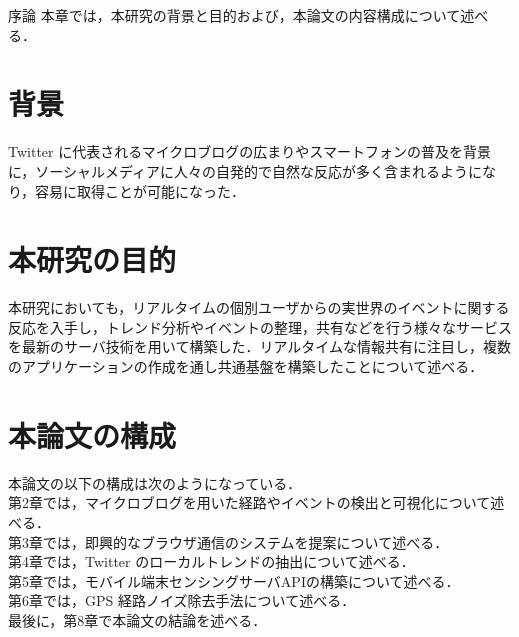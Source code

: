 \chapterhead
{序論}
{本章では，本研究の背景と目的および，本論文の内容構成について述べる．}

\section{背景}
Twitter に代表されるマイクロブログの広まりやスマートフォンの普及を背景に，ソーシャルメディアに人々の自発的で自然な反応が多く含まれるようになり，容易に取得ことが可能になった．

\section{本研究の目的}
本研究においても，リアルタイムの個別ユーザからの実世界のイベントに関する反応を入手し，トレンド分析やイベントの整理，共有などを行う様々なサービスを最新のサーバ技術を用いて構築した．リアルタイムな情報共有に注目し，複数のアプリケーションの作成を通し共通基盤を構築したことについて述べる．

\section{本論文の構成}
本論文の以下の構成は次のようになっている．\\
第2章では，マイクロブログを用いた経路やイベントの検出と可視化について述べる．\\
第3章では，即興的なブラウザ通信のシステムを提案について述べる．\\
第4章では，Twitter のローカルトレンドの抽出について述べる．\\
第5章では，モバイル端末センシングサーバAPIの構築について述べる．\\
第6章では，GPS 経路ノイズ除去手法について述べる．\\
最後に，第8章で本論文の結論を述べる．\\

\newpage
